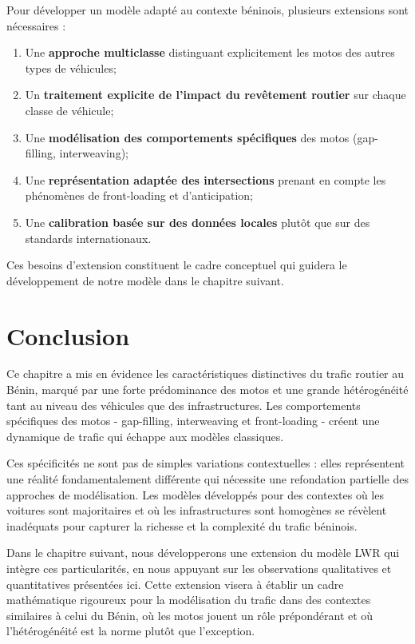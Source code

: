 Pour développer un modèle adapté au contexte béninois, plusieurs extensions sont nécessaires :

\begin{enumerate}
\item Une \textbf{approche multiclasse} distinguant explicitement les motos des autres types de véhicules;
\item Un \textbf{traitement explicite de l'impact du revêtement routier} sur chaque classe de véhicule;
\item Une \textbf{modélisation des comportements spécifiques} des motos (gap-filling, interweaving);
\item Une \textbf{représentation adaptée des intersections} prenant en compte les phénomènes de front-loading et d'anticipation;
\item Une \textbf{calibration basée sur des données locales} plutôt que sur des standards internationaux.
\end{enumerate}

Ces besoins d'extension constituent le cadre conceptuel qui guidera le développement de notre modèle dans le chapitre suivant.

\section{Conclusion}
\label{sec:conclusion_specificites}

Ce chapitre a mis en évidence les caractéristiques distinctives du trafic routier au Bénin, marqué par une forte prédominance des motos et une grande hétérogénéité tant au niveau des véhicules que des infrastructures. Les comportements spécifiques des motos - gap-filling, interweaving et front-loading - créent une dynamique de trafic qui échappe aux modèles classiques.

Ces spécificités ne sont pas de simples variations contextuelles : elles représentent une réalité fondamentalement différente qui nécessite une refondation partielle des approches de modélisation. Les modèles développés pour des contextes où les voitures sont majoritaires et où les infrastructures sont homogènes se révèlent inadéquats pour capturer la richesse et la complexité du trafic béninois.

Dans le chapitre suivant, nous développerons une extension du modèle LWR qui intègre ces particularités, en nous appuyant sur les observations qualitatives et quantitatives présentées ici. Cette extension visera à établir un cadre mathématique rigoureux pour la modélisation du trafic dans des contextes similaires à celui du Bénin, où les motos jouent un rôle prépondérant et où l'hétérogénéité est la norme plutôt que l'exception.
